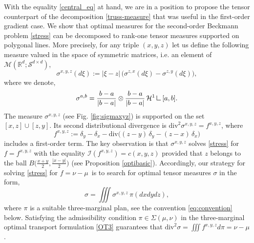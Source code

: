 \documentclass[11pt,letterpaper,reqno]{amsart}
\theoremstyle{definition}
\numberwithin{equation}{section}
\newcommand{\R}{\mathbb{R}}
\newcommand{\Mes}{{\mathcal{M}}}
\newcommand{\dive}{{\mathrm{div}}}
\newcommand{\abs}[1]{{\left \lvert #1 \right \rvert}}
\newcommand{\I}{\mathcal{I}}
\newcommand{\Ha}{\mathcal{H}}
\newcommand{\Sdd}{{\mathcal{S}^{d \times d}}}
\newcommand{\mres}{\mathbin{\vrule height 1.6ex depth 0pt width
		0.13ex\vrule height 0.13ex depth 0pt width 1.3ex}}
\begin{document}
With the equality \eqref{central_eq} at hand,  we are in a position to propose the tensor counterpart of the decomposition \eqref{truss-measure} that was useful in the first-order gradient case. We show that optimal  measures for  the second-order Beckmann problem \eqref{stress}
can be decomposed to rank-one tensor measures supported on polygonal lines. More precisely, for any triple $(x,y,z)$  let us define  the following measure valued in the space of symmetric matrices, i.e. an element of  $\Mes(\R^d;\Sdd)$,
\begin{equation}\label{si-xyz}
	\sigma^{x,y,z}(d\xi) := \abs{\xi-z}\,\Big(\sigma^{z,x}(d\xi) - \sigma^{z,y}(d\xi)\Big) ,
\end{equation}
where we denote,
\begin{equation}
 \sigma^{a,b} = \frac{b-a}{|b-a|} \otimes  \frac{b-a}{|b-a|} \, \Ha^1 \mres [a,b] .
\end{equation}
The measure $\sigma^{x,y,z}$ (see Fig. \ref{fig:sigmaxyz}) is supported on the set  $[x,z] \cup [z,y]$. Its second distributional divergence is $\dive^2 \sigma^{x,y,z} =f^{x,y,z}$, where 
\begin{equation}\label{f-xyz}
f^{x,y,z}:= \delta_y - \delta_x - \dive\big((z-y)\,\delta_y - (z-x)\,\delta_x \big)
\end{equation}
 includes a first-order term. The key observation is that  $\sigma^{x,y,z}$ solves \eqref{stress} 
 for $f=f^{x,y,z}$ with the equality $\I(f^{x,y,z}) = c(x,y,z)$  provided that  $z$ belongs to the ball $B\big(\frac{x+y}{2}, \frac{|x-y|}{2}\big)$ (see Proposition \ref{optibasic}). 
 Accordingly,  our strategy for solving \eqref{stress} for $f=\nu-\mu$\, is to search for optimal tensor measures
  $\sigma$ in the form,
\begin{equation*}\label{grid-measure}
\sigma = \iiint \sigma^{x,y,z} \, \pi(dxdydz),
\end{equation*}
where $\pi$ is a suitable  three-marginal plan, see the convention \eqref{eq:convention} below. Satisfying the admissibility condition $\pi \in \Sigma(\mu,\nu)$ in the three-marginal optimal transport formulation \eqref{OT3} guarantees that $\dive^2 \sigma = \iiint f^{x,y,z} d\pi = \nu-\mu$.
\end{document}
